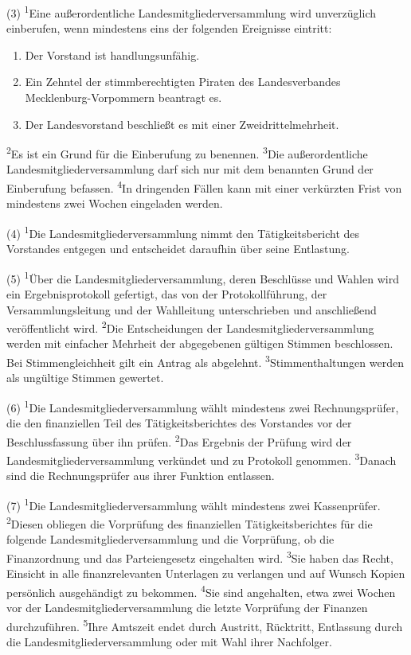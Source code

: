 (3) \textsuperscript{1}Eine außerordentliche Landesmitgliederversammlung
wird unverzüglich einberufen, wenn mindestens eins der folgenden
Ereignisse eintritt:

\begin{enumerate}
\item
  Der Vorstand ist handlungsunfähig.
\item
  Ein Zehntel der stimmberechtigten Piraten des Landesverbandes
  Mecklenburg-Vorpommern beantragt es.
\item
  Der Landesvorstand beschließt es mit einer Zweidrittelmehrheit.
\end{enumerate}
\textsuperscript{2}Es ist ein Grund für die Einberufung zu benennen.
\textsuperscript{3}Die außerordentliche Landesmitgliederversammlung darf
sich nur mit dem benannten Grund der Einberufung befassen.
\textsuperscript{4}In dringenden Fällen kann mit einer verkürzten Frist
von mindestens zwei Wochen eingeladen werden.

(4) \textsuperscript{1}Die Landesmitgliederversammlung nimmt den
Tätigkeitsbericht des Vorstandes entgegen und entscheidet daraufhin über
seine Entlastung.

(5) \textsuperscript{1}Über die Landesmitgliederversammlung, deren
Beschlüsse und Wahlen wird ein Ergebnisprotokoll gefertigt, das von der
Protokollführung, der Versammlungsleitung und der Wahlleitung
unterschrieben und anschließend veröffentlicht wird.
\textsuperscript{2}Die Entscheidungen der Landesmitgliederversammlung
werden mit einfacher Mehrheit der abgegebenen gültigen Stimmen
beschlossen. Bei Stimmengleichheit gilt ein Antrag als abgelehnt.
\textsuperscript{3}Stimmenthaltungen werden als ungültige Stimmen
gewertet.

(6) \textsuperscript{1}Die Landesmitgliederversammlung wählt mindestens
zwei Rechnungsprüfer, die den finanziellen Teil des Tätigkeitsberichtes
des Vorstandes vor der Beschlussfassung über ihn prüfen.
\textsuperscript{2}Das Ergebnis der Prüfung wird der
Landesmitgliederversammlung verkündet und zu Protokoll genommen.
\textsuperscript{3}Danach sind die Rechnungsprüfer aus ihrer Funktion
entlassen.

(7) \textsuperscript{1}Die Landesmitgliederversammlung wählt mindestens
zwei Kassenprüfer. \textsuperscript{2}Diesen obliegen die Vorprüfung des
finanziellen Tätigkeitsberichtes für die folgende
Landesmitgliederversammlung und die Vorprüfung, ob die Finanzordnung und
das Parteiengesetz eingehalten wird. \textsuperscript{3}Sie haben das
Recht, Einsicht in alle finanzrelevanten Unterlagen zu verlangen und auf
Wunsch Kopien persönlich ausgehändigt zu bekommen.
\textsuperscript{4}Sie sind angehalten, etwa zwei Wochen vor der
Landesmitgliederversammlung die letzte Vorprüfung der Finanzen
durchzuführen. \textsuperscript{5}Ihre Amtszeit endet durch Austritt,
Rücktritt, Entlassung durch die Landesmitgliederversammlung oder mit
Wahl ihrer Nachfolger.

